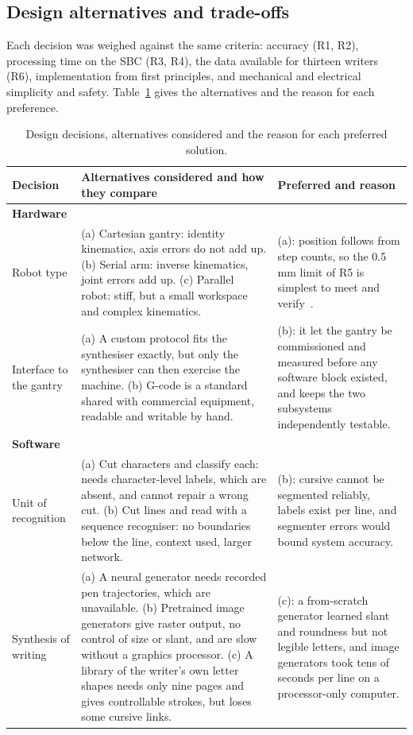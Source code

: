 \subsection{Design alternatives and trade-offs}
\label{sec:app-alternatives}

Each decision was weighed against the same criteria: accuracy (R1, R2), processing time on the SBC (R3, R4), the data available for thirteen writers (R6), implementation from first principles, and mechanical and electrical simplicity and safety. Table~\ref{tab:app-tradeoffs} gives the alternatives and the reason for each preference.

\begin{table}[htbp]
\centering
\fontsize{8}{9.4}\selectfont
\begin{tabular}{|p{2.5cm}|p{6.6cm}|p{4.2cm}|}
\hline
\textbf{Decision} & \textbf{Alternatives considered and how they compare} & \textbf{Preferred and reason} \\
\hline
\multicolumn{3}{|l|}{\textbf{Hardware}} \\
\hline
Robot type & (a) Cartesian gantry: identity kinematics, axis errors do not add up. (b) Serial arm: inverse kinematics, joint errors add up. (c) Parallel robot: stiff, but a small workspace and complex kinematics. & (a): position follows from step counts, so the 0.5\,mm limit of R5 is simplest to meet and verify~\cite{teikari2016}. \\
\hline
Interface to the gantry & (a) A custom protocol fits the synthesiser exactly, but only the synthesiser can then exercise the machine. (b) G-code is a standard shared with commercial equipment, readable and writable by hand. & (b): it let the gantry be commissioned and measured before any software block existed, and keeps the two subsystems independently testable. \\
\hline
\multicolumn{3}{|l|}{\textbf{Software}} \\
\hline
Unit of recognition & (a) Cut characters and classify each: needs character-level labels, which are absent, and cannot repair a wrong cut. (b) Cut lines and read with a sequence recogniser: no boundaries below the line, context used, larger network. & (b): cursive cannot be segmented reliably, labels exist per line, and segmenter errors would bound system accuracy. \\
\hline
Synthesis of writing & (a) A neural generator needs recorded pen trajectories, which are unavailable. (b) Pretrained image generators give raster output, no control of size or slant, and are slow without a graphics processor. (c) A library of the writer's own letter shapes needs only nine pages and gives controllable strokes, but loses some cursive links. & (c): a from-scratch generator learned slant and roundness but not legible letters, and image generators took tens of seconds per line on a processor-only computer. \\
\hline
\end{tabular}
\caption{Design decisions, alternatives considered and the reason for each preferred solution.}
\label{tab:app-tradeoffs}
\end{table}

